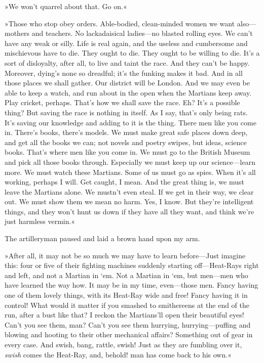 »We won't quarrel about that. Go on.«

»Those who stop obey orders. Able-bodied, clean-minded women we want also—mothers and teachers. No lackadaisical ladies—no blasted rolling eyes. We can't have any weak or silly. Life is real again, and the useless and cumbersome and mischievous have to die. They ought to die. They ought to be willing to die. It's a sort of disloyalty, after all, to live and taint the race. And they can't be happy. Moreover, dying's none so dreadful; it's the funking makes it bad. And in all those places we shall gather. Our district will be London. And we may even be able to keep a watch, and run about in the open when the Martians keep away. Play cricket, perhaps. That's how we shall save the race. Eh? It's a possible thing? But saving the race is nothing in itself. As I say, that's only being rats. It's saving our knowledge and adding to it is the thing. There men like you come in. There's books, there's models. We must make great safe places down deep, and get all the books we can; not novels and poetry swipes, but ideas, science books. That's where men like you come in. We must go to the British Museum and pick all those books through. Especially we must keep up our science—learn more. We must watch these Martians. Some of us must go as spies. When it's all working, perhaps I will. Get caught, I mean. And the great thing is, we must leave the Martians alone. We mustn't even steal. If we get in their way, we clear out. We must show them we mean no harm. Yes, I know. But they're intelligent things, and they won't hunt us down if they have all they want, and think we're just harmless vermin.«

The artilleryman paused and laid a brown hand upon my arm.

»After all, it may not be so much we may have to learn before—Just imagine this: four or five of their fighting machines suddenly starting off—Heat-Rays right and left, and not a Martian in `em. Not a Martian in `em, but men—men who have learned the way how. It may be in my time, even—those men. Fancy having one of them lovely things, with its Heat-Ray wide and free! Fancy having it in control! What would it matter if you smashed to smithereens at the end of the run, after a bust like that? I reckon the Martians'll open their beautiful eyes! Can't you see them, man? Can't you see them hurrying, hurrying—puffing and blowing and hooting to their other mechanical affairs? Something out of gear in every case. And swish, bang, rattle, swish! Just as they are fumbling over it, \textit{swish} comes the Heat-Ray, and, behold! man has come back to his own.«

